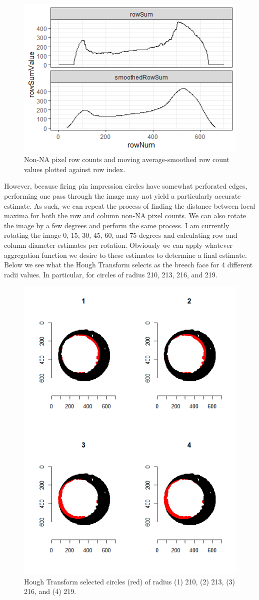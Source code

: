 \documentclass[]{book}
\begin{document}
\begin{figure}

{\centering \includegraphics[width=0.5\linewidth]{images/cartridge_cases/nonNA_rowSums} 

}

\caption{Non-NA pixel row counts and moving average-smoothed row count values plotted against row index.}\label{fig:unnamed-chunk-25}
\end{figure}

However, because firing pin impression circles have somewhat perforated edges, performing one pass through the image may not yield a particularly accurate estimate. As such, we can repeat the process of finding the distance between local maxima for both the row and column non-NA pixel counts. We can also rotate the image by a few degrees and perform the same process. I am currently rotating the image 0, 15, 30, 45, 60, and 75 degrees and calculating row and column diameter estimates per rotation. Obviously we can apply whatever aggregation function we desire to these estimates to determine a final estimate. Below we see what the Hough Transform selects as the breech face for 4 different radii values. In particular, for circles of radius 210, 213, 216, and 219.

\begin{figure}

{\centering \includegraphics[width=0.5\linewidth]{images/cartridge_cases/houghTransformGridSearch} 

}

\caption{Hough Transform selected circles (red) of radius (1) 210, (2) 213, (3) 216, and (4) 219.}\label{fig:unnamed-chunk-26}
\end{figure}
\end{document}

